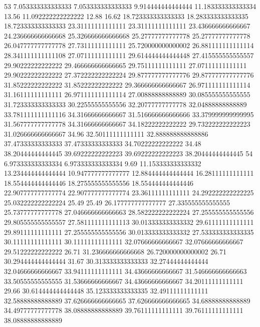 53 7.053333333333333 7.053333333333333 9.914444444444444 11.183333333333334 13.56 11.092222222222222 12.88 16.62 18.723333333333333 18.283333333333335 18.723333333333333 23.31111111111111 23.31111111111111 23.436666666666667 24.236666666666668 25.326666666666668 25.27777777777778 25.27777777777778 26.047777777777778 27.73111111111111 25.720000000000002 26.881111111111114 28.341111111111108 27.07111111111111 29.614444444444448 27.415555555555557 29.90222222222222 29.466666666666665 29.75111111111111 27.07111111111111 29.90222222222222 27.372222222222224 29.877777777777776 29.877777777777776 31.85222222222222 31.85222222222222 29.366666666666667 26.971111111111114 31.16111111111111 26.971111111111114 27.00888888888889 30.085555555555555 31.723333333333333 30.22555555555556 32.20777777777778 32.04888888888889 33.781111111111116 34.31666666666667 31.516666666666666 33.379999999999995 31.567777777777778 34.31666666666667 34.18222222222222 29.732222222222223 31.026666666666667 34.96 32.50111111111111 32.888888888888886 37.47333333333333 37.47333333333333 34.70222222222222 34.48 38.20444444444445 39.69222222222223 39.69222222222223 38.20444444444445
54 6.973333333333334 6.973333333333334 9.69 11.153333333333332 13.234444444444444 10.947777777777777 12.884444444444444 16.28111111111111 18.554444444444446 18.275555555555556 18.554444444444446 22.907777777777774 22.907777777777774 23.36111111111111 24.292222222222225 25.032222222222224 25.49 25.49 26.177777777777777 27.335555555555555 25.73777777777778 27.046666666666663 28.582222222222224 27.255555555555556 29.805555555555557 27.581111111111113 30.013333333333332 29.61111111111111 29.89111111111111 27.255555555555556 30.013333333333332 27.533333333333335 30.11111111111111 30.11111111111111 32.07666666666667 32.07666666666667 29.51222222222222 26.71 31.236666666666668 26.720000000000002 26.71 30.294444444444444 31.67 30.313333333333333 32.27444444444444 32.04666666666667 33.94111111111111 34.43666666666667 31.546666666666663 33.50555555555555 31.53666666666667 34.43666666666667 34.20111111111111 29.66 30.614444444444448 35.123333333333335 32.49111111111111 32.58888888888889 37.626666666666665 37.626666666666665 34.68888888888889 34.49777777777778 38.08888888888889 39.76111111111111 39.76111111111111 38.08888888888889
